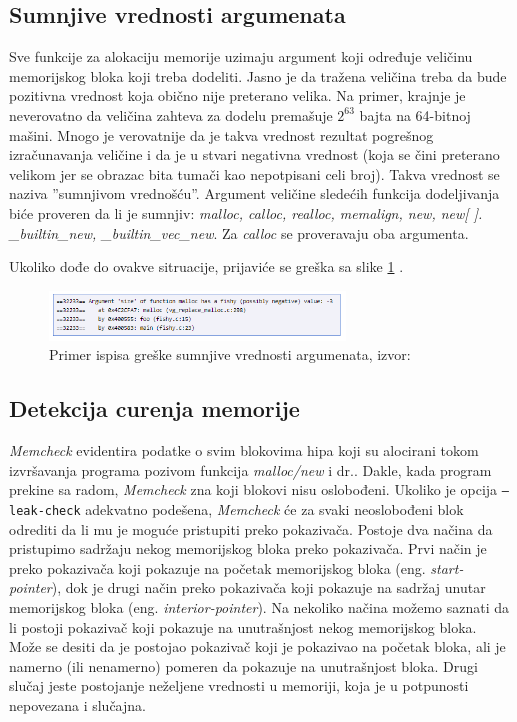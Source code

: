 \documentclass[12pt,oneside]{memoir}
\theoremstyle{plain}
\theoremstyle{definition}
\begin{document}
\subsection{Sumnjive vrednosti argumenata}
Sve funkcije za alokaciju memorije uzimaju argument koji određuje veličinu memorijskog bloka koji treba dodeliti. Jasno je da tražena veličina treba da bude pozitivna vrednost koja obično nije preterano velika. Na primer, krajnje je neverovatno da veličina zahteva za dodelu premašuje ${2}^{63}$ bajta na 64-bitnoj mašini. Mnogo je verovatnije da je takva vrednost rezultat pogrešnog izračunavanja veličine i da je u stvari negativna vrednost (koja se čini preterano velikom jer se obrazac bita tumači kao nepotpisani celi broj). Takva vrednost se naziva ''sumnjivom vrednošću''. Argument veličine sledećih funkcija dodeljivanja biće proveren da li je sumnjiv: \textit{malloc, calloc, realloc, memalign, new, new[ ]. \_builtin\_new, \_builtin\_vec\_new}. Za \textit{calloc} se proveravaju oba argumenta.

Ukoliko dođe do ovakve sitruacije, prijaviće se greška sa slike \ref{fig:slika2.11} \cite{Memcheck}. 
\begin{figure}[!ht]
  \centering
  \includegraphics[width=0.7\textwidth]{fishyArgument.png}
  \caption{Primer ispisa greške sumnjive vrednosti argumenata, izvor: \cite{Memcheck}}
  \label{fig:slika2.11}
\end{figure}

\subsection{Detekcija curenja memorije}
\textit{Memcheck} evidentira podatke o svim blokovima hipa koji su alocirani tokom izvršavanja programa pozivom funkcija \textit{malloc/new} i dr.. Dakle, kada program prekine sa radom, \textit{Memcheck} zna koji blokovi nisu oslobođeni. Ukoliko je opcija \texttt{--leak-check}  adekvatno podešena, \textit{Memcheck} će za svaki neoslobođeni blok odrediti da li mu je moguće pristupiti preko pokazivača. 
Postoje dva načina da pristupimo sadržaju nekog memorijskog bloka preko pokazivača. Prvi način je preko pokazivača koji pokazuje na početak memorijskog bloka (eng. \textit{start-pointer}), dok je drugi način preko pokazivača koji pokazuje na sadržaj unutar memorijskog bloka (eng. \textit{interior-pointer}). Na nekoliko načina možemo saznati da li postoji pokazivač koji pokazuje na unutrašnjost nekog memorijskog bloka. Može se desiti da je postojao pokazivač koji je pokazivao na početak bloka, ali je namerno (ili nenamerno) pomeren da pokazuje na unutrašnjost bloka. Drugi slučaj jeste postojanje neželjene vrednosti u memoriji, koja je u potpunosti nepovezana i slučajna.
\end{document}
